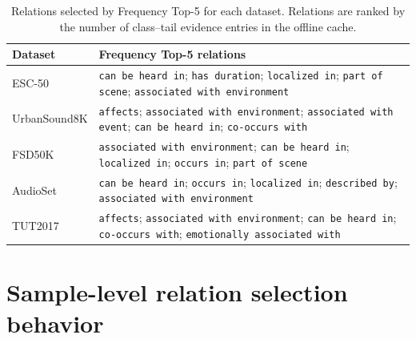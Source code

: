 \begin{table}[H]
\centering
\caption{Relations selected by Frequency Top-5 for each dataset. Relations are ranked by the number of class--tail evidence entries in the offline cache.}
\label{tab:frequency-relations}
\setlength{\tabcolsep}{4pt}
\begin{tabular}{lp{}}
\toprule
Dataset & Frequency Top-5 relations \\
\midrule
ESC-50 & \texttt{can be heard in}; \texttt{has duration}; \texttt{localized in}; \texttt{part of scene}; \texttt{associated with environment} \\
UrbanSound8K & \texttt{affects}; \texttt{associated with environment}; \texttt{associated with event}; \texttt{can be heard in}; \texttt{co-occurs with} \\
FSD50K & \texttt{associated with environment}; \texttt{can be heard in}; \texttt{localized in}; \texttt{occurs in}; \texttt{part of scene} \\
AudioSet & \texttt{can be heard in}; \texttt{occurs in}; \texttt{localized in}; \texttt{described by}; \texttt{associated with environment} \\
TUT2017 & \texttt{affects}; \texttt{associated with environment}; \texttt{can be heard in}; \texttt{co-occurs with}; \texttt{emotionally associated with} \\
\bottomrule
\end{tabular}
\end{table}


\section{Sample-level relation selection behavior}\label{app:selector-behavior}
\setcounter{table}{0}
\renewcommand{\thetable}{D.\arabic{table}}


